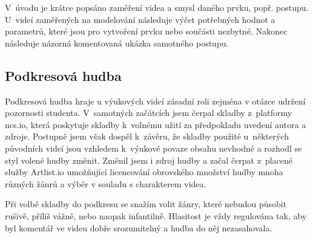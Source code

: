 V~úvodu je krátce popsáno zaměření videa a smysl daného prvku, popř. postupu.
U~videí zaměřených na modelování následuje výčet potřebných hodnot a parametrů, které jsou pro vytvoření prvku nebo součásti nezbytné.
Nakonec následuje názorná komentovaná ukázka samotného postupu.

\subsection{Podkresová hudba}
Podkresová hudba hraje u výukových videí zásadní roli zejména v otázce udržení pozornosti studenta.
V~samotných začátcích jsem čerpal skladby z~platformy ncs.io, která poskytuje skladby k~volnému užití za předpokladu uvedení autora a zdroje.
Postupně jsem však dospěl k~závěru, že skladby použité u~některých původních videí jsou vzhledem k~výukové povaze obsahu nevhodné a rozhodl se styl volené hudby změnit. 
Změnil jsem i zdroj hudby a začal čerpat z~placené služby Artlist.io umožňující licencování obrovského množství hudby mnoha různých žánrů a výběr v souladu s charakterem videa.

Při volbě skladby do podkresu se snažím volit žánry, které nebudou působit rušivě, příliš vážně, nebo naopak infantilně.
Hlasitost je vždy regulována tak, aby byl komentář ve videu dobře srozumitelný a hudba do něj nezasahovala.

